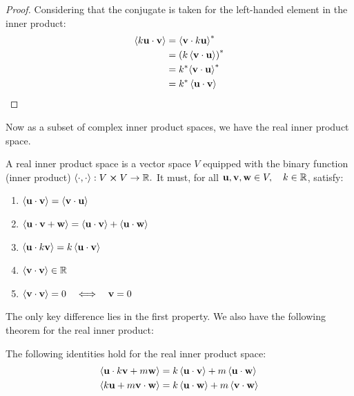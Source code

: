\documentclass[12pt]{article}
\begin{document}
\begin{proof}
    Considering that the conjugate is taken for the left-handed element in the inner product:
    \begin{align*}
        \left\langle k \mathbf{u} \cdot \mathbf{v} \right\rangle &= {\left\langle\mathbf{v} \cdot k \mathbf{u} \right\rangle}^* \\
        &= {(k \left\langle\mathbf{v} \cdot \mathbf{u} \right\rangle)}^* \\ 
        &= {k}^* {\left\langle\mathbf{v} \cdot \mathbf{u} \right\rangle}^*\\
        &= {k}^* \left\langle\mathbf{u} \cdot \mathbf{v} \right\rangle
    \end{align*}
\end{proof}

Now as a subset of complex inner product spaces, we have the real inner product space. 

\begin{definition}
    A real inner product space is a vector space $V$ equipped with the binary function (inner product) $\left\langle \cdot, \cdot \right\rangle: V \cross V \rightarrow \mathbb{R}.$  It must, for all $\mathbf{u}, \mathbf{v}, \mathbf{w} \in V, \quad k \in \mathbb{R}$, satisfy:
    \begin{enumerate}
        \item $\left\langle\mathbf{u} \cdot \mathbf{v} \right\rangle = \left\langle\mathbf{v} \cdot \mathbf{u} \right\rangle$
        \item $\left\langle\mathbf{u} \cdot \mathbf{v} + \mathbf{w} \right\rangle = \left\langle\mathbf{u} \cdot \mathbf{v} \right\rangle + \left\langle\mathbf{u} \cdot \mathbf{w} \right\rangle$
        \item $\left\langle\mathbf{u} \cdot k \mathbf{v} \right\rangle = k \left\langle\mathbf{u} \cdot \mathbf{v} \right\rangle$
        \item $\left\langle\mathbf{v} \cdot \mathbf{v} \right\rangle \in \mathbb{R}$
        \item $\left\langle\mathbf{v} \cdot \mathbf{v} \right\rangle = 0 \quad \Longleftrightarrow \quad \mathbf{v} = 0$
    \end{enumerate}
\end{definition}

The only key difference lies in the first property. We also have the following theorem for the real inner product:

\begin{theorem}
    The following identities hold for the real inner product space:
    \begin{align*}
        \left\langle\mathbf{u} \cdot k\mathbf{v} + m\mathbf{w} \right\rangle &= k\left\langle\mathbf{u} \cdot \mathbf{v} \right\rangle + m\left\langle\mathbf{u} \cdot \mathbf{w} \right\rangle \\
        \left\langle k\mathbf{u} + m\mathbf{v} \cdot \mathbf{w} \right\rangle &= k\left\langle\mathbf{u} \cdot \mathbf{w} \right\rangle + m\left\langle\mathbf{v} \cdot \mathbf{w} \right\rangle \\
    \end{align*}
\end{theorem}
\end{document}

